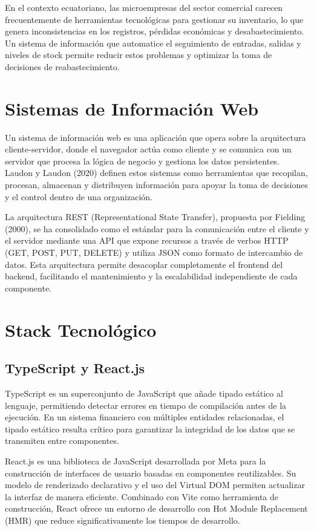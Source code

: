 \documentclass[12pt, letterpaper]{report}
\begin{document}
En el contexto ecuatoriano, las microempresas del sector comercial carecen frecuentemente de herramientas tecnológicas para gestionar su inventario, lo que genera inconsistencias en los registros, pérdidas económicas y desabastecimiento. Un sistema de información que automatice el seguimiento de entradas, salidas y niveles de stock permite reducir estos problemas y optimizar la toma de decisiones de reabastecimiento.

\section{Sistemas de Información Web}

Un sistema de información web es una aplicación que opera sobre la arquitectura cliente-servidor, donde el navegador actúa como cliente y se comunica con un servidor que procesa la lógica de negocio y gestiona los datos persistentes. Laudon y Laudon (2020) definen estos sistemas como herramientas que recopilan, procesan, almacenan y distribuyen información para apoyar la toma de decisiones y el control dentro de una organización.

La arquitectura REST (Representational State Transfer), propuesta por Fielding (2000), se ha consolidado como el estándar para la comunicación entre el cliente y el servidor mediante una API que expone recursos a través de verbos HTTP (GET, POST, PUT, DELETE) y utiliza JSON como formato de intercambio de datos. Esta arquitectura permite desacoplar completamente el frontend del backend, facilitando el mantenimiento y la escalabilidad independiente de cada componente.

\section{Stack Tecnológico}

\subsection{TypeScript y React.js}

TypeScript es un superconjunto de JavaScript que añade tipado estático al lenguaje, permitiendo detectar errores en tiempo de compilación antes de la ejecución. En un sistema financiero con múltiples entidades relacionadas, el tipado estático resulta crítico para garantizar la integridad de los datos que se transmiten entre componentes.

React.js es una biblioteca de JavaScript desarrollada por Meta para la construcción de interfaces de usuario basadas en componentes reutilizables. Su modelo de renderizado declarativo y el uso del Virtual DOM permiten actualizar la interfaz de manera eficiente. Combinado con Vite como herramienta de construcción, React ofrece un entorno de desarrollo con Hot Module Replacement (HMR) que reduce significativamente los tiempos de desarrollo.
\end{document}
